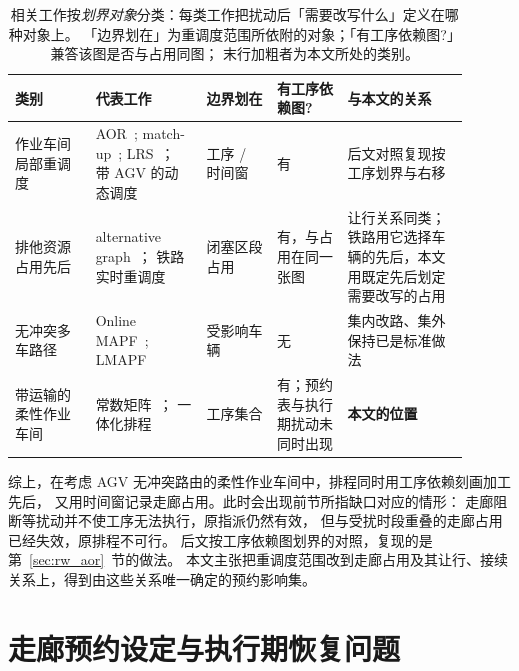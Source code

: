 \begin{table}[t]
\centering
\caption{相关工作按\emph{划界对象}分类：每类工作把扰动后「需要改写什么」定义在哪种对象上。
「边界划在」为重调度范围所依附的对象；「有工序依赖图?」兼答该图是否与占用同图；
末行加粗者为本文所处的类别。}
\label{tab:position}
\small
\begin{tabular}{@{}p{0.16\linewidth}p{0.22\linewidth}p{0.14\linewidth}p{0.14\linewidth}p{0.24\linewidth}@{}}
\toprule
\textbf{类别} & \textbf{代表工作} & \textbf{边界划在} & \textbf{有工序依赖图?} & \textbf{与本文的关系} \\
\midrule
作业车间局部重调度 &
AOR~\cite{abumaizar1997rescheduling,subramaniam2003maor};
match-up~\cite{akturk1999matchup};
LRS~\cite{kuster2007local}；
带 AGV 的动态调度~\cite{zhang2023energy,tang2026dynamic} &
工序 / 时间窗 & 有 &
后文对照复现按工序划界与右移 \\
\addlinespace[2pt]
排他资源占用先后 &
alternative graph~\cite{mascis2002alternative}；
铁路实时重调度~\cite{dariano2007branch} &
闭塞区段占用 & 有，与占用在同一张图 &
让行关系同类；铁路用它选择车辆的先后，本文用既定先后划定需要改写的占用 \\
\addlinespace[2pt]
无冲突多车路径 &
Online MAPF~\cite{svancara2019online,malka2024online};
LMAPF~\cite{zhang2024guidance} &
受影响车辆 & 无 &
集内改路、集外保持已是标准做法 \\
\addlinespace[2pt]
带运输的柔性作业车间 &
常数矩阵~\cite{xin2025review,meng2025cp,qin2026knowledge,fu2025integrated}；
一体化排程~\cite{vanos2026exact,sun2023integrated,li2026framework} &
工序集合 & 有；预约表与执行期扰动未同时出现 &
\textbf{本文的位置} \\
\bottomrule
\end{tabular}
\end{table}

综上，在考虑 AGV 无冲突路由的柔性作业车间中，排程同时用工序依赖刻画加工先后，
又用时间窗记录走廊占用。此时会出现前节所指缺口对应的情形：
走廊阻断等扰动并不使工序无法执行，原指派仍然有效，
但与受扰时段重叠的走廊占用已经失效，原排程不可行。
后文按工序依赖图划界的对照，复现的是第~\ref{sec:rw_aor}~节的做法。
本文主张把重调度范围改到走廊占用及其让行、接续关系上，得到由这些关系唯一确定的预约影响集。

\section{走廊预约设定与执行期恢复问题}
\label{sec:problem}

